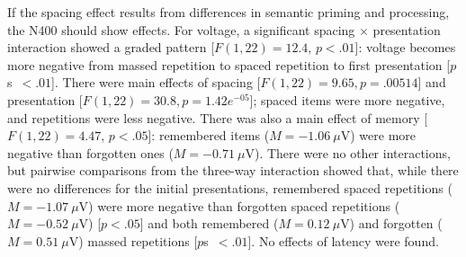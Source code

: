 If the spacing effect results from differences in semantic priming and processing, the N400 should show effects.
For voltage, a significant spacing $\times$ presentation interaction showed a graded pattern [$F(1,22)=12.4$, $p<.01$]: voltage becomes more negative from massed repetition to spaced repetition to first presentation [$p$s~$<.01$].  There were main effects of spacing [$F(1,22)=9.65, p=.00514$] and presentation [$F(1,22)=30.8, p=1.42e^{-05}$]; spaced items were more negative, and repetitions were less negative.  There was also a main effect of memory [$F(1,22)=4.47$, $p<.05$]: remembered items ($M=-1.06~\mu$V) were more negative than forgotten ones ($M=-0.71~\mu$V).
\cbstart There were no other interactions, but pairwise comparisons from the three-way interaction showed that, while there were no differences for the initial presentations, remembered spaced repetitions ($M=-1.07~\mu$V) were more negative than forgotten spaced repetitions ($M=-0.52~\mu$V) [$p<.05$] and both remembered ($M=0.12~\mu$V) and forgotten ($M=0.51~\mu$V) massed repetitions [$p$s~$<.01$].\cbend
No effects of latency were found.

